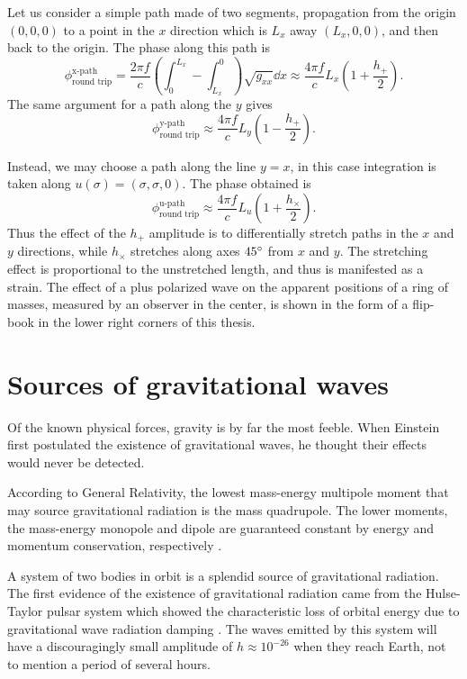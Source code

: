 Let us consider a simple path made of two segments, propagation from the origin $(0,0,0)$ to a point in the $x$ direction which is $L_x$ away $(L_x,0,0)$, and then back to the origin. %
The phase along this path is
\begin{equation}
\phi_{\text{round trip}}^{\text{x-path}}= \frac{2\pi f}{c} \left(\int_0^{L_x}-\int^0_{L_x}\right)\sqrt{g_{xx}}\dd x \approx \frac{4\pi f}{c} L_x \left(1+\frac{h_+}{2}\right).
\end{equation} 
The same argument for a path along the $y$ gives
\begin{equation}
\phi_{\text{round trip}}^{\text{y-path}} \approx \frac{4\pi f}{c} L_y \left(1-\frac{h_+}{2}\right).
\end{equation} 

Instead, we may choose a path along the line $y=x$, in this case integration is taken along $ u(\sigma) = (\sigma,\sigma,0)$. %
The phase obtained is
\begin{equation}
\phi_{\text{round trip}}^{\text{u-path}} \approx \frac{4\pi f}{c} L_u \left(1+\frac{h_\times}{2}\right).
\end{equation} 
Thus the effect of the $h_+$ amplitude is to differentially stretch paths in the $x$ and $y$ directions, while $h_\times$ stretches along axes $45 ^\circ$ from $x$ and $y$. %
The stretching effect is proportional to the unstretched length, and thus is manifested as a strain. %
The effect of a plus polarized wave on the apparent positions of a ring of masses, measured by an observer in the center, is shown in the form of a flip-book in the lower right corners of this thesis.

\section{Sources of gravitational waves}
Of the known physical forces, gravity is by far the most feeble. %
When Einstein first postulated the existence of gravitational waves, he thought their effects would never be detected.

According to General Relativity, the lowest mass-energy multipole moment that may source gravitational radiation is the mass quadrupole. %
The lower moments, the mass-energy monopole and dipole are guaranteed constant by energy and momentum conservation, respectively \cite[Section 7.5]{carroll2004spacetime}.

A system of two bodies in orbit is a splendid source of gravitational radiation. %
The first evidence of the existence of gravitational radiation came from the Hulse-Taylor pulsar system which showed the characteristic loss of orbital energy due to gravitational wave radiation damping \cite{Taylor1979}. %
The waves emitted by this system will have a discouragingly small amplitude of $h\approx 10^{-26}$ when they reach Earth, not to mention a period of several hours. %


